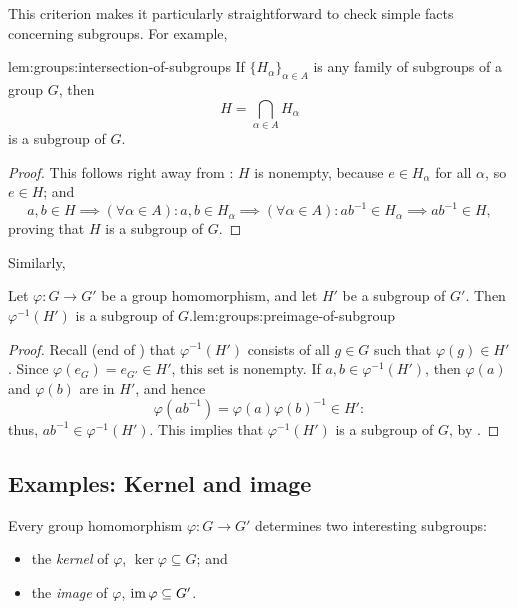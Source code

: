 This criterion makes it particularly straightforward to check simple
facts concerning subgroups. For example,

\begin{lem}{}{lem:groups:intersection-of-subgroups}
  If $\{H_\alpha\}_{\alpha \in A}$ is any family of subgroups
of a group $G$, then
\[
  H = \bigcap_{\alpha \in A} H_\alpha
\]
is a subgroup of $G$.
\end{lem}
\begin{proof}
  This follows right away from
  : $H$ is nonempty,
  because $e \in H_\alpha$ for all $\alpha$, so $e \in H$; and
  \[
    a, b \in H \implies (\forall \alpha \in A) : a, b \in H_\alpha
    \implies (\forall \alpha \in A) : ab^{-1} \in H_\alpha \implies
    ab^{-1} \in H,
  \]
  proving that $H$ is a subgroup of $G$.
\end{proof}

Similarly,

\begin{lem}{Let $\varphi : G \to G'$ be a group homomorphism, and let
    $H'$ be a subgroup of $G'$. Then $\varphi^{-1}(H')$ is a subgroup
    of $G$.}{lem:groups:preimage-of-subgroup}
\end{lem}
\begin{proof}
  Recall (end of
  )
  that $\varphi^{-1}(H')$ consists of all $g \in G$ such that
  $\varphi(g) \in H'$. Since $\varphi(e_G) = e_{G'} \in H'$, this set
  is nonempty. If $a, b \in \varphi^{-1}(H')$, then $\varphi(a)$ and
  $\varphi(b)$ are in $H'$, and hence
  \[
    \varphi(ab^{-1}) = \varphi(a)\varphi(b)^{-1} \in H':
  \]
  thus, $ab^{-1} \in \varphi^{-1}(H')$. This implies that
  $\varphi^{-1}(H')$ is a subgroup of $G$, by
  .
\end{proof}

\subsection{Examples: Kernel and image}
\label{subsec:groups:examples-kernel-and-image}
Every group homomorphism $\varphi : G \to G'$ determines two
interesting subgroups:
\begin{itemize}
\item the \emph{kernel} of $\varphi$, $\ker\varphi \subseteq G$; and
\item the \emph{image} of $\varphi$, $\operatorname{im}\varphi \subseteq G'$.
\end{itemize}

